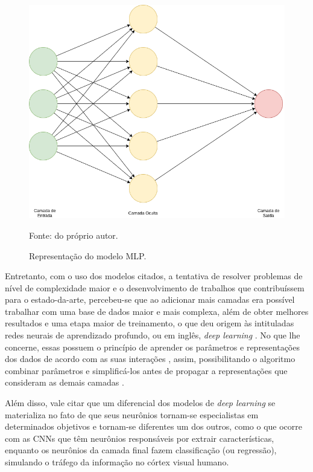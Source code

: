 \begin{figure}[H]
    \centering
    \caption{Representação do modelo MLP.}
    \includegraphics[width=1\linewidth]{recursos/imagens/deep/mlp.png}
    \label{deep:fig:4}

    Fonte: do próprio autor.
\end{figure}

Entretanto, com o uso dos modelos citados, a tentativa de resolver problemas de nível de complexidade maior e o desenvolvimento de trabalhos que contribuíssem para o estado-da-arte, percebeu-se que ao adicionar mais camadas era possível trabalhar com uma base de dados maior e mais complexa, além de obter melhores resultados e uma etapa maior de treinamento, o que deu origem às intituladas redes neurais de aprendizado profundo, ou em inglês, \textit{deep learning} \citep{Goodfellow2016}. No que lhe concerne, essas possuem o princípio de aprender os parâmetros e representações dos dados de acordo com as suas interações \citep{ponti2018funciona}, assim, possibilitando o algoritmo combinar parâmetros e simplificá-los antes de propagar a representações que consideram as demais camadas \citep{Goodfellow2016}.

Além disso, vale citar que um diferencial dos modelos de \textit{deep learning} se materializa no fato de que seus neurônios tornam-se especialistas em determinados objetivos e tornam-se diferentes um dos outros, como o que ocorre com as CNNs que têm neurônios responsáveis por extrair características, enquanto os neurônios da camada final fazem classificação (ou regressão), simulando o tráfego da informação no córtex visual humano.

